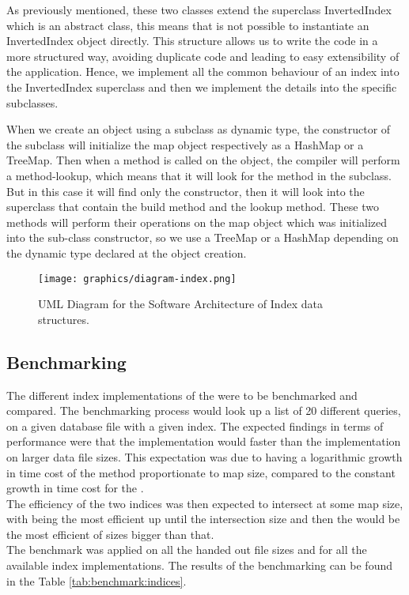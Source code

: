 As previously mentioned, these two classes extend the superclass InvertedIndex which is an abstract class, this means that is not possible to instantiate an InvertedIndex object directly. This structure allows us to write the code in a more structured way, avoiding duplicate code and leading to easy extensibility of the application. Hence, we implement all the common behaviour of an index into the InvertedIndex superclass and then we implement the details into the specific subclasses.

When we create an object using a subclass as dynamic type, the constructor of the subclass will initialize the map object respectively as a HashMap or a TreeMap. Then when a method is called on the object, the compiler will perform a method-lookup, which means that it will look for the method in the subclass. But in this case it will find only the constructor, then it will look into the superclass that contain the build method and the lookup method. These two methods will perform their operations on the map object which was initialized into the sub-class constructor, so we use a TreeMap or a HashMap depending on the dynamic type declared at the object creation.


\begin{figure}[t]
	\centering
	\texttt{[image: graphics/diagram-index.png]}
	\caption{UML Diagram for the Software Architecture of Index data structures.}
	\label{fig:index:uml}
\end{figure}



\subsection{Benchmarking}
The different index implementations of the were to be benchmarked and compared. 
The benchmarking process would look up a list of 20 different queries, on a given database file with a given index. The expected findings in terms of performance were that the  implementation would faster than the  implementation on larger data file sizes. This expectation was due to  having a logarithmic growth in time cost of the  method proportionate to map size, compared to the constant growth in time cost for the . \\
The efficiency of the two indices was then expected to intersect at some map size, with  being the most efficient up until the intersection size and then the  would be the most efficient of sizes bigger than that. \\
The benchmark was applied on all the handed out file sizes and for all the available index implementations. The results of the benchmarking can be found in the Table \ref{tab:benchmark:indices}.

